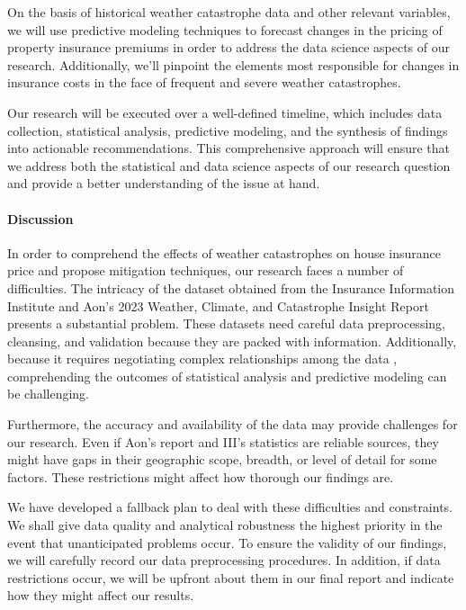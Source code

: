 \documentclass[12pt]{article}
\begin{document}
On the basis of historical weather catastrophe data and other relevant variables, we will use predictive modeling techniques to 
forecast changes in the pricing of property insurance premiums in order to address the data science aspects of our research. 
Additionally, we'll pinpoint the elements most responsible for changes in insurance costs in the face of frequent and severe weather 
catastrophes.

Our research will be executed over a well-defined timeline, which includes data collection, statistical analysis, predictive modeling, 
and the synthesis of findings into actionable recommendations. This comprehensive approach will ensure that we address both the 
statistical and data science aspects of our research question and provide a better understanding of the issue at hand.

\paragraph{Discussion}
In order to comprehend the effects of weather catastrophes on house insurance price and propose mitigation techniques, our research 
faces a number of difficulties. The intricacy of the dataset obtained from the Insurance Information Institute and Aon's 2023 Weather, 
Climate, and Catastrophe Insight Report presents a substantial problem. These datasets need careful data preprocessing, cleansing, and 
validation because they are packed with information. Additionally, because it requires negotiating complex relationships among the data
, comprehending the outcomes of statistical analysis and predictive modeling can be challenging.

Furthermore, the accuracy and availability of the data may provide challenges for our research. Even if Aon's report and III's 
statistics are reliable sources, they might have gaps in their geographic scope, breadth, or level of detail for some factors. 
These restrictions might affect how thorough our findings are.

We have developed a fallback plan to deal with these difficulties and constraints. We shall give data quality and analytical 
robustness the highest priority in the event that unanticipated problems occur. To ensure the validity of our findings, we will 
carefully record our data preprocessing procedures. In addition, if data restrictions occur, we will be upfront about them in our 
final report and indicate how they might affect our results.
\end{document}
